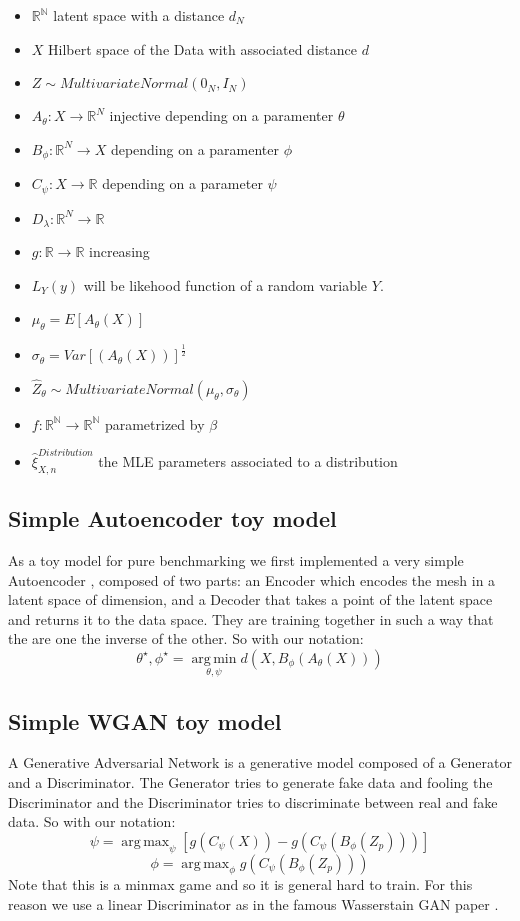 \documentclass{article}
\DeclareMathOperator*{\argmax}{arg\,max}
\DeclareMathOperator*{\argmin}{arg\,min}
\begin{document}
\begin{itemize}
\item $\mathbb{R^{N}}$ latent space with a distance $d_{N}$
\item $X$ Hilbert space of the Data with associated distance $d$
\item $Z\sim MultivariateNormal(0_{N},I_{N})$ 
\item $A_{\theta}:X \rightarrow \mathbb{R}^{N}$ injective depending on a paramenter $\theta$
\item $B_{\phi}:\mathbb{R}^{N} \rightarrow X$ depending on a paramenter $\phi$
\item $C_{\psi}:X \rightarrow \mathbb{R}$ depending on a parameter $\psi$
\item $D_{\lambda}: \mathbb{R}^{N} \rightarrow \mathbb{R}$
\item $g:\mathbb{R} \rightarrow \mathbb{R}$ increasing   
\item $L_{Y}(y)$ will be likehood function of a random variable $Y$.
\item $\mu_{\theta}= E[A_{\theta}(X)]$
\item $\sigma_{\theta}=Var[(A_{\theta}(X))]^{\frac{1}{2}}$
\item $\hat{Z}_{\theta}\sim MultivariateNormal(\mu_{\theta},\sigma_{\theta})$
\item $f:\mathbb{R^{N}} \rightarrow \mathbb{R^{N}}$ parametrized by $\beta$
\item $\hat{\xi}_{X,n}^{Distribution}$ the MLE parameters associated to a distribution
\end{itemize}


\subsection{Simple Autoencoder toy model}
As a toy model for pure benchmarking we first implemented a very simple Autoencoder \cite{auto}, composed of two parts: an Encoder which encodes the mesh in a latent space of dimension, and a Decoder that takes a point of the latent space and returns it to the data space. They are training together in such a way that the are one the inverse of the other. So with our notation:
$$\theta^{\star},\phi^{\star}=\argmin \limits_{\theta,\psi}d(X,B_{\phi}(A_{\theta}(X)))$$

\subsection{Simple WGAN toy model}
A Generative Adversarial Network \cite{gan} is a generative model composed of a Generator and a Discriminator. The Generator tries to generate fake data and fooling the Discriminator and the Discriminator tries to discriminate between real and fake data. So with our notation:
$$\psi=\argmax_{\psi}[g(C_{\psi}(X))-g(C_{\psi}(B_{\phi}(Z_{p})))]$$
$$\phi=\argmax_{\phi} g(C_{\psi}(B_{\phi}(Z_{p})))$$
Note that this is a minmax game and so it is general hard to train.
For this reason we use a linear Discriminator as in the famous Wasserstain GAN paper \cite{wgan}.
\end{document}
